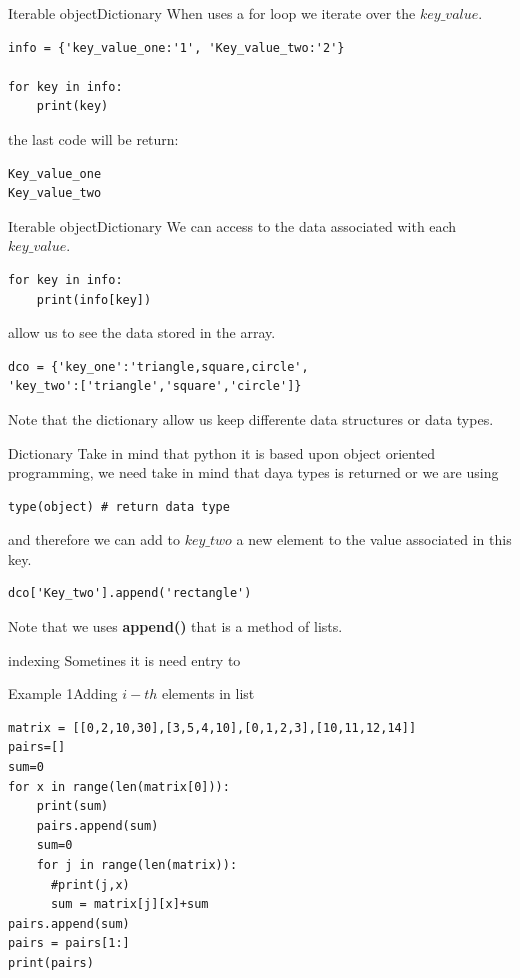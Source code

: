 \documentclass{beamer}
\begin{document}
\begin{frame}[fragile]{Iterable object}{Dictionary}
When uses a for loop we iterate over the $key\_value$.
\begin{lstlisting}
info = {'key_value_one:'1', 'Key_value_two:'2'}

for key in info:
	print(key)
\end{lstlisting}
the last code will be return:\\
\begin{verbatim}
Key_value_one 
Key_value_two
\end{verbatim}
\end{frame}



\begin{frame}[fragile]{Iterable object}{Dictionary}
We can access to  the data associated with each $key\_value$.
\begin{lstlisting}
for key in info:
	print(info[key])
\end{lstlisting}
allow us to see the data stored in the array.
\begin{lstlisting}
dco = {'key_one':'triangle,square,circle',
'key_two':['triangle','square','circle']}
\end{lstlisting}
Note that the dictionary allow us keep differente data structures or data types.
\end{frame}

\begin{frame}[fragile]{Dictionary}
Take in mind that python it is based upon object oriented programming, we need take in mind that daya types is returned or we are using 
\begin{lstlisting}
type(object) # return data type
\end{lstlisting}
and therefore we can add to $key\_two$ a new element to the value associated in this key.

\begin{lstlisting}
dco['Key_two'].append('rectangle')
\end{lstlisting}
Note that we uses \textbf{append()} that is a method of lists.
\end{frame}






\begin{frame}[fragile]{indexing}
Sometines it is need entry to 
\end{frame}



\begin{frame}[fragile]{Example 1}{Adding $i-th$ elements in list}
\begin{lstlisting}
matrix = [[0,2,10,30],[3,5,4,10],[0,1,2,3],[10,11,12,14]]
pairs=[]
sum=0
for x in range(len(matrix[0])):
    print(sum)
    pairs.append(sum)
    sum=0
    for j in range(len(matrix)):
      #print(j,x)
      sum = matrix[j][x]+sum
pairs.append(sum)
pairs = pairs[1:]
print(pairs)
\end{lstlisting}
\end{frame}
\end{document}
